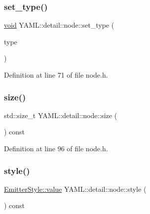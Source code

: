 \subsubsection{\texorpdfstring{set\_type()}{set\_type()}}
{\footnotesize\ttfamily \mbox{\hyperlink{glad_8h_a950fc91edb4504f62f1c577bf4727c29}{void}} Y\+A\+M\+L\+::detail\+::node\+::set\+\_\+type (\begin{DoxyParamCaption}\item[{\mbox{\hyperlink{struct_y_a_m_l_1_1_node_type_af83cf3f3c2eca0bf0eae1bbf981e86c4}{Node\+Type\+::value}}}]{type }\end{DoxyParamCaption})\hspace{0.3cm}{\ttfamily [inline]}}



Definition at line 71 of file node.\+h.

\mbox{\label{class_y_a_m_l_1_1detail_1_1node_a639ac77d890584bd12ce7b6fd51b98b0}} 
\subsubsection{\texorpdfstring{size()}{size()}}
{\footnotesize\ttfamily std\+::size\+\_\+t Y\+A\+M\+L\+::detail\+::node\+::size (\begin{DoxyParamCaption}{ }\end{DoxyParamCaption}) const\hspace{0.3cm}{\ttfamily [inline]}}



Definition at line 96 of file node.\+h.

\mbox{\label{class_y_a_m_l_1_1detail_1_1node_a66bd0395a746cbcb3607e441dd8726ff}} 
\subsubsection{\texorpdfstring{style()}{style()}}
{\footnotesize\ttfamily \mbox{\hyperlink{struct_y_a_m_l_1_1_emitter_style_ae86640662c85ce6062a37f9636b6959f}{Emitter\+Style\+::value}} Y\+A\+M\+L\+::detail\+::node\+::style (\begin{DoxyParamCaption}{ }\end{DoxyParamCaption}) const\hspace{0.3cm}{\ttfamily [inline]}}



